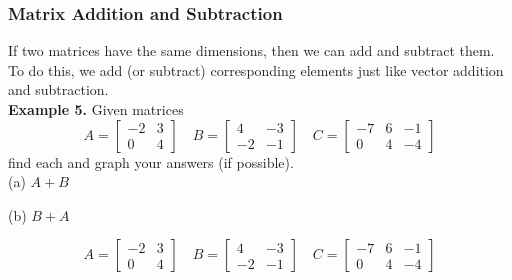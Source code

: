\documentclass{article}
\begin{document}
\newpage

\subsubsection*{Matrix Addition and Subtraction}

If two matrices have the same dimensions, then we can add and subtract them. \newline\\

To do this, we add (or subtract) corresponding elements just like vector addition and subtraction.	\newline\\

{\color{red}\textbf{Example 5.}} Given matrices 
\[
A = \begin{bmatrix}
-2 & 3 \\
0 & 4 
\end{bmatrix}
\quad
B = \begin{bmatrix}
4 & -3 \\
-2 & -1
\end{bmatrix}
\quad
C = \begin{bmatrix}
-7 & 6 & -1 \\
0 & 4 & -4 
\end{bmatrix}
\]
find each and graph your answers (if possible).  \newline\\

(a) \quad $A + B$   \newline\\

\vfill

(b) \quad $B + A$   \newline\\

\newpage

\[
A = \begin{bmatrix}
-2 & 3 \\
0 & 4 
\end{bmatrix}
\quad
B = \begin{bmatrix}
4 & -3 \\
-2 & -1
\end{bmatrix}
\quad
C = \begin{bmatrix}
-7 & 6 & -1 \\
0 & 4 & -4 
\end{bmatrix}
\]
\end{document}
